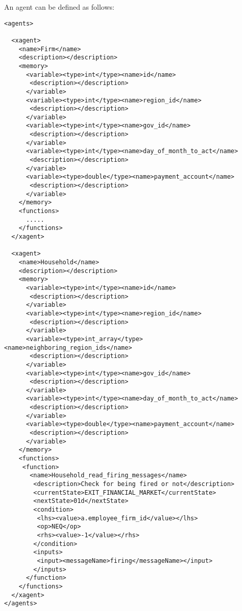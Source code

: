 An agent can be defined as follows:
\begin{mylisting}
\begin{verbatim}
<agents>

  <xagent>
    <name>Firm</name>
    <description></description>
    <memory>
      <variable><type>int</type><name>id</name>
       <description></description>
      </variable>
      <variable><type>int</type><name>region_id</name>
       <description></description>
      </variable>
      <variable><type>int</type><name>gov_id</name>
       <description></description>
      </variable>
      <variable><type>int</type><name>day_of_month_to_act</name>
       <description></description>
      </variable>
      <variable><type>double</type><name>payment_account</name>
       <description></description>
      </variable>
    </memory>
    <functions>
      .....
    </functions>
  </xagent>

  <xagent>
    <name>Household</name>
    <description></description>
    <memory>
      <variable><type>int</type><name>id</name>
       <description></description>
      </variable>
      <variable><type>int</type><name>region_id</name>
       <description></description>
      </variable>
      <variable><type>int_array</type><name>neighboring_region_ids</name>
       <description></description>
      </variable>
      <variable><type>int</type><name>gov_id</name>
       <description></description>
      </variable>
      <variable><type>int</type><name>day_of_month_to_act</name>
       <description></description>
      </variable>
      <variable><type>double</type><name>payment_account</name>
       <description></description>
      </variable>
    </memory>
    <functions>
     <function>
       <name>Household_read_firing_messages</name>
        <description>Check for being fired or not</description>
        <currentState>EXIT_FINANCIAL_MARKET</currentState>
        <nextState>01d</nextState>
        <condition>
         <lhs><value>a.employee_firm_id</value></lhs>
         <op>NEQ</op>
         <rhs><value>-1</value></rhs>
        </condition>
        <inputs>
         <input><messageName>firing</messageName></input>
        </inputs>
      </function>
    </functions>
  </xagent>
</agents>
\end{verbatim}
\end{mylisting}

